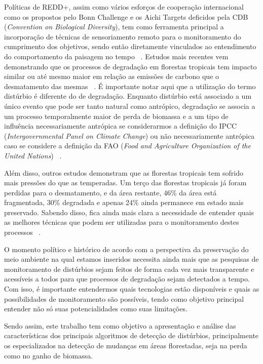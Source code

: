 \documentclass[twocolumn]{article}
\begin{document}
\par
Políticas de REDD+, assim como vários esforços de cooperação internacional como os propostos pelo Bonn Challenge e os Aichi Targets deficidos pela CDB (\textit{Convention on Biological Diversity}), tem como ferramenta principal a incorporação de técnicas de sensoriamento remoto para o monitoramento do cumprimento dos objetivos, sendo então diretamente vinculados ao entendimento do comportamento da paisagem no tempo ~\cite{BOS2019295, CROUZEILLES2019}. Estudos mais recentes vem demonstrando que os processos de degradação em florestas tropicais tem impacto similar ou até mesmo maior em relação as emissões de carbono que o desmatamento das mesmas ~\cite{Harris1573, Houghton2012, Grace2014}. É importante notar aqui que a utilização do termo distúrbio é diferente do de degradação. Enquanto distúrbio está associado a um único evento que pode ser tanto natural como antrópico, degradação se associa a um processo temporalmente maior de perda de biomassa e a um tipo de influência necessariamente antrópica se considerarmos a definição do IPCC (\textit{Intergovernmental Panel on Climate Change}) ou não necessariamente antrópica caso se considere a definição da FAO (\textit{Food and Agriculture Organization of the United Nations}) ~\cite{Hirschmugl2017}. 
\par
Além disso, outros estudos demonstram que as florestas tropicais tem sofrido mais pressões do que as temperadas. Um terço das florestas tropicais já foram perdidas para o desmatamento, e da área restante, 46\% da área está fragmentada, 30\% degradada e apenas 24\% ainda permanece em estado mais preservado. Sabendo disso, fica ainda mais clara a necessidade de entender quais as melhores técnicas que podem ser utilizadas para o monitoramento destes processos ~\cite{Hirschmugl2017}. 
\par
O momento político e histórico de acordo com a perspectiva da preservação do meio ambiente na qual estamos inseridos necessita ainda mais que as pesquisas de monitoramento de distúrbios sejam feitos de forma cada vez mais transparente e acessíveis a todos para que processos de degradação sejam detectados a tempo. Com isso, é importante entendermos quais tecnologias estão disponíveis e quais as possibilidades de monitoramento são possíveis, tendo como objetivo principal entender não só suas potencialidades como suas limitações. 
\par
Sendo assim, este trabalho tem como objetivo a apresentação e análise das características dos principais algoritmos de detecção de distúrbios, principalmente os especializados na detecção de mudanças em áreas florestadas, seja na perda como no ganho de biomassa.
\par
\end{document}

